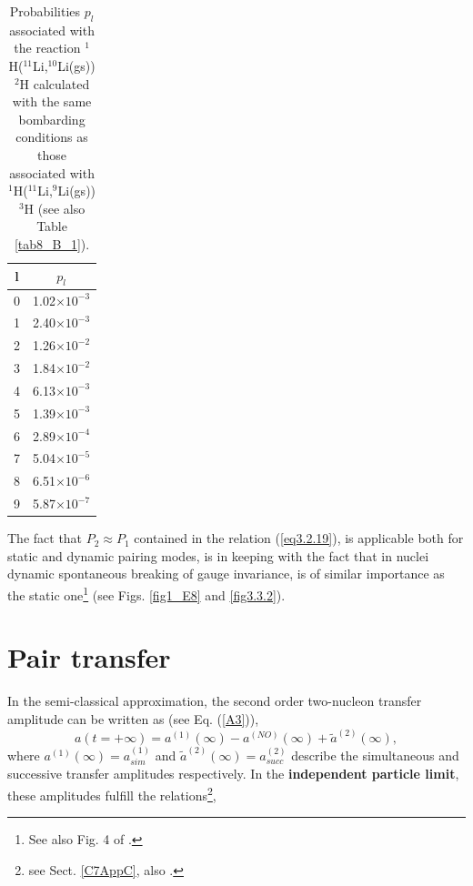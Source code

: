   \begin{table}
  \begin{tabular}{|c|c|}
  \hline  l & $p_l$ \\ 
\hline  0 & 1.02$\times 10^{-3}$ \\ 
\hline  1 & 2.40$\times 10^{-3}$ \\ 
\hline  2 &  1.26$\times 10^{-2}$ \\ 
\hline  3 &  1.84$\times 10^{-2}$ \\ 
\hline  4 &  6.13$\times 10^{-3}$\\ 
\hline  5 &  1.39$\times 10^{-3}$\\ 
\hline  6 &  2.89$\times 10^{-4}$\\ 
\hline  7 &  5.04$\times 10^{-5}$\\ 
\hline  8 &  6.51$\times 10^{-6}$\\ 
\hline  9 &  5.87$\times 10^{-7}$\\
\hline
  \end{tabular}\caption{Probabilities $p_l$  associated with the reaction $^1$H($^{11}$Li,$^{10}$Li(gs))$^2$H calculated with the same bombarding conditions as those associated with $^1$H($^{11}$Li,$^{9}$Li(gs))$^3$H (see also Table \ref{tab8_B_1}).}\label{tab3.3.1}
  \end{table}

 The fact that $P_2\approx P_1$  contained in the relation (\ref{eq3.2.19}), is applicable both for static and dynamic pairing modes, is  in keeping with the fact that in nuclei dynamic spontaneous breaking of gauge invariance, is of similar importance as the static one\footnote{See also Fig. 4 of \cite{Potel:13b}.} (see Figs. \ref{fig1_E8} and \ref{fig3.3.2}). 








\section{Pair transfer}\label{trans_nutAppA}
In the semi-classical approximation, the second order two-nucleon transfer amplitude can be written as (see Eq. (\ref{A3})), 
\begin{equation}\label{eq.4.5.1x}
a(t = + \infty) = a^{(1)}(\infty) - a^{(NO)}(\infty) + \tilde a^{(2)} ( \infty),
\end{equation}
where $a^{(1)}(\infty)=a^{(1)}_{sim}$ and $\tilde a^{(2)} (\infty)=a^{(2)}_{succ}$ describe the simultaneous and successive transfer amplitudes respectively.
   In the \textbf{independent particle limit}, these amplitudes fulfill the relations\footnote{see Sect. \ref{C7AppC}, also \cite{Potel:13}.},




